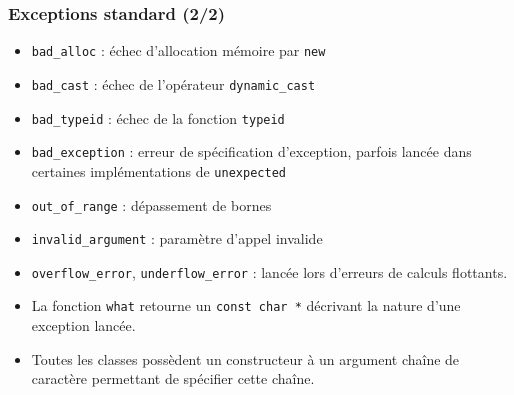 \begin{frame}
\frametitle{Exceptions standard (2/2)}
\begin{itemize}[<+->]
\item \texttt{bad\_alloc} : échec d'allocation mémoire par \texttt{new}
\item \texttt{bad\_cast} : échec de l'opérateur \lstinline|dynamic_cast|
\item \texttt{bad\_typeid} : échec de la fonction \texttt{typeid}
\item \texttt{bad\_exception} : erreur de spécification d'exception, parfois lancée dans certaines implémentations de \texttt{unexpected}
\item \texttt{out\_of\_range} : dépassement de bornes
\item \texttt{invalid\_argument} : paramètre d'appel invalide
\item \texttt{overflow\_error}, \texttt{underflow\_error} : lancée lors d'erreurs de calculs flottants.
\item La fonction \texttt{what} retourne un \lstinline|const char *| décrivant la nature d'une exception lancée.
\item Toutes les classes possèdent un constructeur à un argument chaîne de caractère permettant de spécifier cette chaîne.
\end{itemize}
\end{frame}


